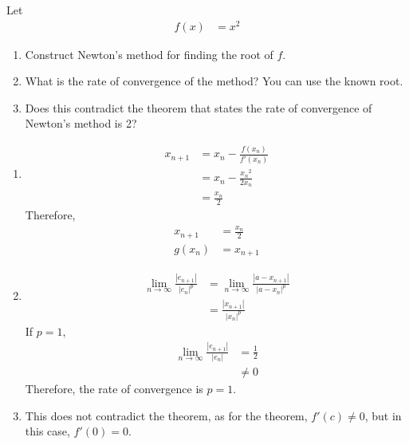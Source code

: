 \documentclass[fleqn, a4paper, 11pt, oneside]{amsart}
\theoremstyle{definition}
\theoremstyle{theorem}
\begin{document}
\begin{question}
	Let
	\begin{align*}
		f(x) & = x^2
	\end{align*}
	\begin{enumerate}
		\item
			Construct Newton's method for finding the root of $f$.
		\item
			What is the rate of convergence of the method?
			You can use the known root.
		\item
			Does this contradict the theorem that states the rate of convergence of Newton's method is 2?
	\end{enumerate}
\end{question}

\begin{solution}
	\begin{enumerate}[leftmargin=*]
		\item
			\begin{align*}
				x_{n + 1} & = x_n - \frac{f(x_n)}{f'(x_n)} \\
                                          & = x_n - \frac{{x_n}^2}{2 x_n}  \\
                                          & = \frac{x_n}{2}
			\end{align*}
			Therefore,
			\begin{align*}
				x_{n + 1} & = \frac{x_n}{2} \\
				g(x_n)    & = x_{n + 1}
			\end{align*}
		\item
			\begin{align*}
				\lim\limits_{n \to \infty} \frac{|e_{n + 1}|}{|e_n|^p} & = \lim\limits_{n \to \infty} \frac{|a - x_{n + 1}|}{|a - x_n|^p} \\
                                                                                       & = \frac{|x_{n + 1}|}{|x_n|^p}
			\end{align*}
			If $p = 1$,
			\begin{align*}
				\lim\limits_{n \to \infty} \frac{|e_{n + 1}|}{|e_n|} & = \frac{1}{2} \\
                                                                                     & \neq 0
			\end{align*}
			Therefore, the rate of convergence is $p = 1$.
		\item
			This does not contradict the theorem, as for the theorem, $f'(c) \neq 0$, but in this case, $f'(0) = 0$.
	\end{enumerate}
\end{solution}
\end{document}
